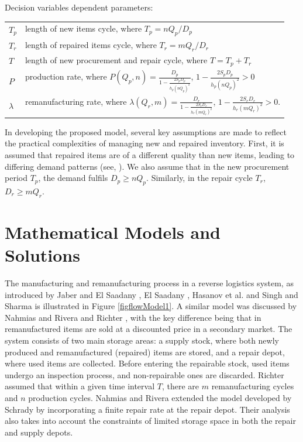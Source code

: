 \documentclass[11pt]{article}
\newcommand{\ds}{\displaystyle}
\begin{document}
\noindent Decision variables dependent parameters:
\begin{table} [H]
\begin{tabular}{l l}
$T_p$& length of new items cycle, where $T_p=nQ_p/D_p$\\
$T_r$& length of repaired items cycle, where $T_r=mQ_r/D_r$\\
$T$& length of new procurement and repair cycle, where $T=T_p+T_r$\\
$P$ & production rate, where \(\ds P(Q_p, n) = \frac{D_p}{1 - \frac{2S_pD_p}{h_p(nQ_p)^2}}\), \(1 - \frac{2S_pD_p}{h_p(nQ_p)^2}>0 \)\\
$\lambda$ & remanufacturing rate, where \(\ds \lambda(Q_r, m) = \frac{D_r}{1 - \frac{2S_rD_r}{h_r(mQ_r)^2}}\), \(1 - \frac{2S_rD_r}{h_r(mQ_r)^2}>0\).
\end{tabular}
\end{table}
\par
\noindent In developing the proposed model, several key assumptions are made to reflect the practical complexities of managing new and repaired inventory. First, it is assumed that repaired items are of a different quality than new items, leading to differing demand patterns (see, \cite{Singh2016, Jaber2009}). We also assume that in the new procurement period $T_p$, the demand fulfils $D_p \geq nQ_p$. Similarly, in the repair cycle $T_r$,  $D_r \geq mQ_r$. 

\section{Mathematical Models and Solutions}\label{mathmodel}
The manufacturing and remanufacturing process in a reverse logistics system, as introduced by Jaber and El Saadany \cite{Jaber2009}, El Saadany \cite{Saadany2009}, Hasanov et al. \cite{Hasanov2012} and Singh and Sharma \cite{Singh2016} is illustrated in Figure \ref{figflowModel1}. A similar model was discussed by Nahmias and Rivera \cite{Nahmias1979} and Richter \cite{Richter1996a, Richter1996b, Richter1997}, with the key difference being that in \cite{Singh2016, Jaber2009, Hasanov2012} remanufactured items are sold at a discounted price in a secondary market. The system consists of two main storage areas: a supply stock, where both newly produced and remanufactured (repaired) items are stored, and a repair depot, where used items are collected. Before entering the repairable stock, used items undergo an inspection process, and non-repairable ones are discarded. Richter \cite{Richter1996b} assumed that within a given time interval \(T\), there are \(m\) remanufacturing cycles and \(n\) production cycles. Nahmias and Rivera \cite{Nahmias1979} extended the model developed by Schrady \cite{Schrady1967} by incorporating a finite repair rate at the repair depot. Their analysis also takes into account the constraints of limited storage space in both the repair and supply depots. 
\end{document}
